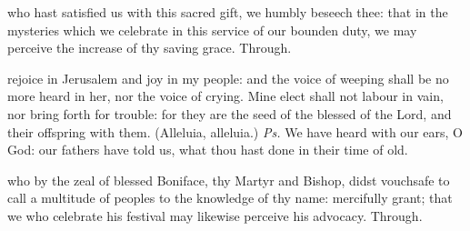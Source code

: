 \vspace{-0.25\baselineskip}

\postcommunion

\vspace{-0.1\baselineskip}

 who hast satisfied us with this sacred gift, we humbly beseech thee: that in the mysteries which we celebrate in this service of our bounden duty, we may perceive the increase of thy saving grace. Through.



\vspace{-0.25\baselineskip}

\introit

\vspace{-0.1\baselineskip}

 rejoice in Jerusalem and joy in my people: and the voice of weeping shall be no more heard in her, nor the voice of crying. Mine elect shall not labour in vain, nor bring forth for trouble: for they are the seed of the blessed of the Lord, and their offspring with them. (Alleluia, alleluia.) \textit{Ps.} We have heard with our ears, O God: our fathers have told us, what thou hast done in their time of old.

\vspace{-0.25\baselineskip}

\collect

\vspace{-0.1\baselineskip}

 who by the zeal of blessed Boniface, thy Martyr and Bishop, didst vouchsafe to call a multitude of peoples to the knowledge of thy name: mercifully grant; that we who celebrate his festival may likewise perceive his advocacy. Through.

